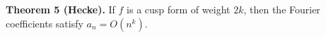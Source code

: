 \textbf{Theorem 5 (Hecke).} If $f$ is a cusp form of weight $2k$, then the Fourier coefficients satisfy $a_n = O(n^k)$.
